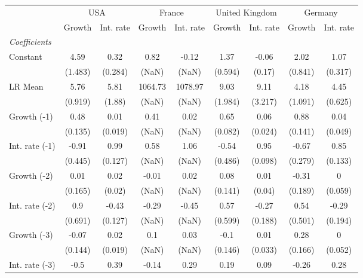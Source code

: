 \begin{table}[htbp] 
	\centering
	 \scriptsize
	\begin{tabular}{@{\extracolsep{4pt}}lcccccccc@{}}		\hline\hline
		 		 & \multicolumn{2}{c}{USA} &\multicolumn{2}{c}{France} &\multicolumn{2}{c}{United Kingdom} &\multicolumn{2}{c}{Germany} \\ 
 		 & Growth 	 & Int. rate 	 & Growth 	 & Int. rate 	 & Growth 	 & Int. rate 	 & Growth 	 & Int. rate\\\cline{2-3}\cline{4-5}\cline{6-7}\cline{8-9}
\rule{0pt}{4ex} 
 \emph{Coefficients} 	  		 & 		 & 		 & 		 & 		 & 		 & 		 & 		 &\\ 
\quad Constant 	 & 4.59 	 & 0.32 	 & 0.82 	 & -0.12 	 & 1.37 	 & -0.06 	 & 2.02 	 & 1.07	 \\ 
 		 & (1.483) 	 & (0.284) 	 & (NaN) 	 & (NaN) 	 & (0.594) 	 & (0.17) 	 & (0.841) 	 & (0.317) 	 \\ 
\quad LR Mean 	 & 5.76 	 & 5.81 	 & 1064.73 	 & 1078.97 	 & 9.03 	 & 9.11 	 & 4.18 	 & 4.45	 \\ 
 		 & (0.919) 	 & (1.88) 	 & (NaN) 	 & (NaN) 	 & (1.984) 	 & (3.217) 	 & (1.091) 	 & (0.625) 	 \\ 
\quad Growth (-1) 	 &0.48 	 & 0.01 	 & 0.41 	 & 0.02 	 & 0.65 	 & 0.06 	 & 0.88 	 & 0.04	 \\ 
 		 & (0.135) 	 & (0.019) 	 & (NaN) 	 & (NaN) 	 & (0.082) 	 & (0.024) 	 & (0.141) 	 & (0.049) 	 \\ 
\quad Int. rate (-1) 	 &-0.91 	 & 0.99 	 & 0.58 	 & 1.06 	 & -0.54 	 & 0.95 	 & -0.67 	 & 0.85	 \\ 
 		 & (0.445) 	 & (0.127) 	 & (NaN) 	 & (NaN) 	 & (0.486) 	 & (0.098) 	 & (0.279) 	 & (0.133) 	 \\ 
\quad Growth (-2) 	 &0.01 	 & 0.02 	 & -0.01 	 & 0.02 	 & 0.08 	 & 0.01 	 & -0.31 	 & 0	 \\ 
 		 & (0.165) 	 & (0.02) 	 & (NaN) 	 & (NaN) 	 & (0.141) 	 & (0.04) 	 & (0.189) 	 & (0.059) 	 \\ 
\quad Int. rate (-2) 	 &0.9 	 & -0.43 	 & -0.29 	 & -0.45 	 & 0.57 	 & -0.27 	 & 0.54 	 & -0.29	 \\ 
 		 & (0.691) 	 & (0.127) 	 & (NaN) 	 & (NaN) 	 & (0.599) 	 & (0.188) 	 & (0.501) 	 & (0.194) 	 \\ 
\quad Growth (-3) 	 &-0.07 	 & 0.02 	 & 0.1 	 & 0.03 	 & -0.1 	 & 0.01 	 & 0.28 	 & 0	 \\ 
 		 & (0.144) 	 & (0.019) 	 & (NaN) 	 & (NaN) 	 & (0.146) 	 & (0.033) 	 & (0.166) 	 & (0.052) 	 \\ 
\quad Int. rate (-3) 	 &-0.5 	 & 0.39 	 & -0.14 	 & 0.29 	 & 0.19 	 & 0.09 	 & -0.26 	 & 0.28	 \\ 

\end{tabular}
\end{table}
